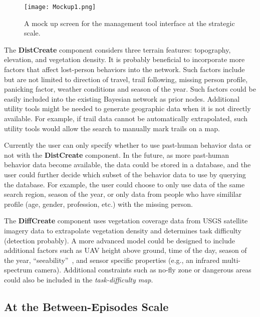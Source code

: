 \begin{figure}
\centering
\texttt{[image: Mockup1.png]}
\caption{A mock up screen for the management tool interface at the strategic scale.}
\label{Mockup1}
\end{figure}

The \textbf{DistCreate} component considers three terrain features: topography, elevation, and vegetation density. It is probably beneficial to incorporate more factors that affect lost-person behaviors into the network. Such factors include but are not limited to direction of travel, trail following, missing person profile, panicking factor, weather conditions and season of the year. Such factors could be easily included into the existing Bayesian network as prior nodes. Additional utility tools might be needed to generate geographic data when it is not directly available. For example, if trail data cannot be automatically extrapolated, such utility tools would allow the search to manually mark trails on a map.

Currently the user can only specify whether to use past-human behavior data or not with the \textbf{DistCreate} component. In the future, as more past-human behavior data become available, the data could be stored in a database, and the user could further decide which subset of the behavior data to use by querying the database. For example, the user could choose to only use data of the same search region, season of the year, or only data from people who have simililar profile (age, gender, profession, etc.) with the missing person.

The \textbf{DiffCreate} component uses vegetation coverage data from USGS satellite imagery data to extrapolate vegetation density and determines task difficulty (detection probably). A more advanced model could be designed to include additional factors such as UAV height above ground, time of the day, season of the year, ``seeability''~\cite{Morse2010UAV}, and sensor specific properties (e.g., an infrared multi-spectrum camera). Additional constraints such as no-fly zone or dangerous areas could also be included in the \textit{task-difficulty map}.

\subsection{At the Between-Episodes Scale}

